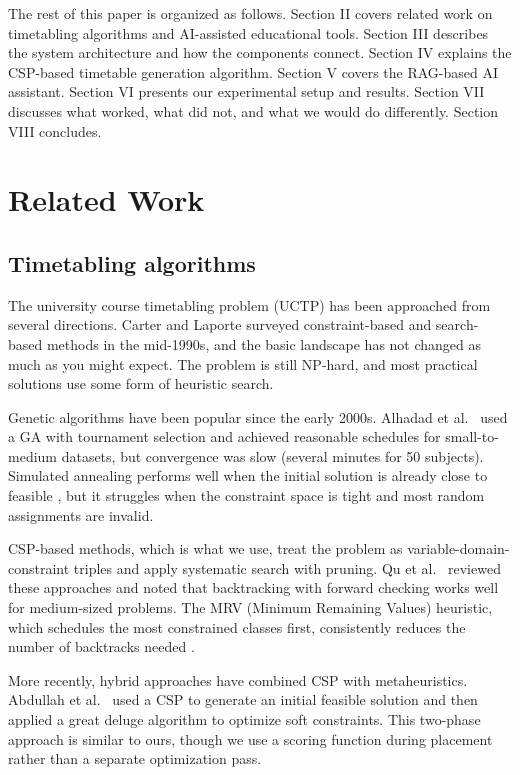 \documentclass[conference]{IEEEtran}
\begin{document}
The rest of this paper is organized as follows. Section II covers related work on timetabling algorithms and AI-assisted educational tools. Section III describes the system architecture and how the components connect. Section IV explains the CSP-based timetable generation algorithm. Section V covers the RAG-based AI assistant. Section VI presents our experimental setup and results. Section VII discusses what worked, what did not, and what we would do differently. Section VIII concludes.


\section{Related Work}

\subsection{Timetabling algorithms}

The university course timetabling problem (UCTP) has been approached from several directions. Carter and Laporte \cite{carter1996recent} surveyed constraint-based and search-based methods in the mid-1990s, and the basic landscape has not changed as much as you might expect. The problem is still NP-hard, and most practical solutions use some form of heuristic search.

Genetic algorithms have been popular since the early 2000s. Alhadad et al.\ \cite{abdelhalim2016utilizing} used a GA with tournament selection and achieved reasonable schedules for small-to-medium datasets, but convergence was slow (several minutes for 50 subjects). Simulated annealing performs well when the initial solution is already close to feasible \cite{abramson1991constructing}, but it struggles when the constraint space is tight and most random assignments are invalid.

CSP-based methods, which is what we use, treat the problem as variable-domain-constraint triples and apply systematic search with pruning. Qu et al.\ \cite{qu2009survey} reviewed these approaches and noted that backtracking with forward checking works well for medium-sized problems. The MRV (Minimum Remaining Values) heuristic, which schedules the most constrained classes first, consistently reduces the number of backtracks needed \cite{dechter2003constraint}.

More recently, hybrid approaches have combined CSP with metaheuristics. Abdullah et al.\ \cite{abdullah2012hybrid} used a CSP to generate an initial feasible solution and then applied a great deluge algorithm to optimize soft constraints. This two-phase approach is similar to ours, though we use a scoring function during placement rather than a separate optimization pass.
\end{document}
